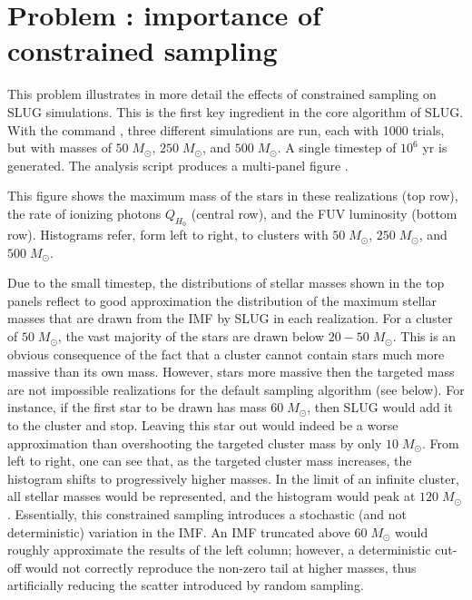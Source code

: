 \documentclass[letterpaper,10pt,english]{sphinxmanual}
\begin{document}
\section{Problem : importance of constrained sampling}
\label{\detokenize{tests:problem-constsampl-importance-of-constrained-sampling}}\label{\detokenize{tests:probsampl-label}}
This problem illustrates in more detail the effects of constrained sampling on SLUG simulations.
This is the first key ingredient in the core algorithm of SLUG. With the command ,
three different  simulations are run, each with 1000 trials, but with masses of \(50\;M_\odot\),
\(250\;M_\odot\), and \(500\;M_\odot\). A single timestep of \(10^6\) yr is generated.
The analysis script  produces a multi-panel
figure .

This figure shows the maximum mass of the stars in these realizations (top row), the
rate of ionizing photons \(Q_{H_0}\) (central row), and the FUV luminosity (bottom row).
Histograms refer, form left to right, to clusters with \(50\;M_\odot\), \(250\;M_\odot\),
and \(500\;M_\odot\).

Due to the small timestep, the distributions of stellar masses shown in the top panels reflect
to good approximation the distribution of the maximum stellar masses that are drawn from the IMF by
SLUG in each realization. For a cluster of \(50\;M_\odot\), the vast majority of the
stars are drawn below  \(20-50\;M_\odot\). This is an obvious consequence of the
fact that a cluster cannot contain stars much more massive than its own mass. However, stars
more massive then the targeted mass are not impossible realizations for the default
sampling algorithm (see below). For instance, if the first star to be drawn has
mass \(60\;M_\odot\), then SLUG would add it to the cluster and stop. Leaving this star out
would indeed be a worse approximation than overshooting the targeted cluster mass by only
\(10\;M_\odot\).  From left to right, one can see that, as the targeted cluster mass increases, the
histogram shifts to progressively higher masses. In the limit of an infinite cluster,
all stellar masses would be represented, and the histogram would peak at \(120\;M_\odot\).
Essentially, this constrained sampling introduces a stochastic (and not deterministic)
variation in the IMF. An IMF truncated above \(60\;M_\odot\) would roughly
approximate the results of the left column; however, a deterministic cut-off
would not correctly reproduce the non-zero tail at higher masses, thus artificially
reducing the scatter introduced by random sampling.
\end{document}
